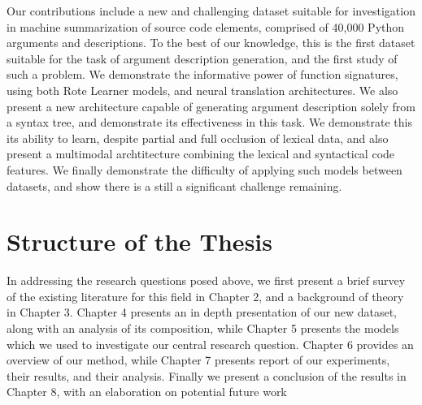 Our contributions include a new and challenging dataset suitable for investigation in machine summarization of source code elements, comprised of 40,000 Python arguments and descriptions.
To the best of our knowledge, this is the first dataset suitable for the task of argument description generation, and the first study of such a problem.
We demonstrate the informative power of function signatures, using both Rote Learner models, and neural translation architectures.
We also present a new architecture capable of generating argument description solely from a syntax tree, and demonstrate its effectiveness in this task.
We demonstrate this its ability to learn, despite partial and full occlusion of lexical data, and also present a multimodal archtitecture combining the lexical and syntactical code features.
We finally demonstrate the difficulty of applying such models between datasets, and show there is a still a significant challenge remaining.


\section{Structure of the Thesis} %
\label{sec:structure_of_the_thesis}

In addressing the research questions posed above, we first present a brief survey of the existing literature for this field in Chapter 2, and a background of theory in Chapter 3.
Chapter 4 presents an in depth presentation of our new dataset, along with an analysis of its composition, while Chapter 5 presents the models which we used to investigate our central research question. 
Chapter 6 provides an overview of our method, while Chapter 7 presents  report of our experiments, their results, and their analysis.
Finally we present a conclusion of the results in Chapter 8, with an elaboration on potential future work










